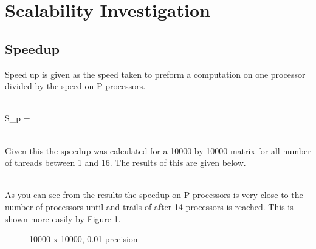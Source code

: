 \documentclass{article}
\begin{document}
\section{Scalability Investigation}
\subsection{Speedup}
Speed up is given as the speed taken to preform a computation on one processor
divided by the speed on P processors.\\~\\
\begin{center}
S_p = \\~\\
\end{center}
Given this the speedup was calculated for a 10000 by 10000 matrix for all number
of threads between 1 and 16. The results of this are given below.\\~\\
\begin{center}
\end{center}

As you can see from the results the speedup on P processors is very close to the
number of processors until and trails of after 14 processors is reached. This is
shown more easily by Figure \ref{fig:speedup}.\\

\begin{figure}[H]
 \centering
 \caption{10000 x 10000, 0.01 precision}
 \label{fig:speedup}
 \end{figure}\\~\\
\end{document}
